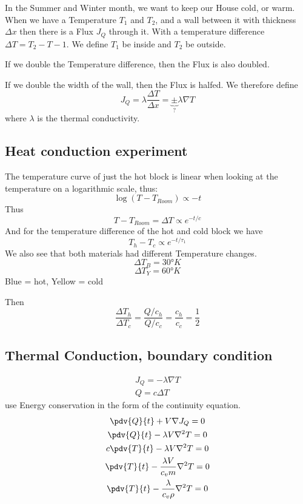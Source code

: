 \documentclass[]{scrartcl}
\begin{document}
In the Summer and Winter month, we want to keep our House cold, or warm. When we have a Temperature $T_1$ and $T_2$, and a wall between it with thickness $\Delta x$ then there is a Flux $J_Q$ through it. With a temperature difference $\Delta T = T_2 - T-1$. We define $T_1$ be inside and $T_2$ be outside.

If we double the Temperature difference, then the Flux is also doubled.

If we double the width of the wall, then the Flux is halfed. We therefore define
\begin{equation}
	J_Q = \lambda \frac{\Delta T}{\Delta x} = \underbrace{\pm}_{?}\lambda\nabla T
\end{equation}
where $\lambda$ is the thermal conductivity.

\subsection{Heat conduction experiment}

The temperature curve of just the hot block is linear when looking at the temperature on a logarithmic scale, thus:
\begin{equation}
	\log{(T-T_{Room})} \propto -t
\end{equation}
Thus
\begin{equation}
	T - T_{Room} = \Delta T\propto e^{-t/c}
\end{equation}
And for the temperature difference of the hot and cold block we have
\begin{equation}
	T_h - T_c \propto e^{-t/\tau_1}
\end{equation}
We also see that both materials had different Temperature changes.
\begin{equation}
	\Delta T_B = 30°K
\end{equation}
\begin{equation}
	\Delta T_Y = 60°K
\end{equation}
Blue = hot, Yellow = cold

Then
\begin{equation}
	\frac{\Delta T_h}{\Delta T_c} = \frac{Q/c_h}{Q/c_c} = \frac{c_h}{c_c} = \frac{1}{2}
\end{equation}

\subsection{Thermal Conduction, boundary condition}

\begin{gather}
	J_Q = -\lambda \nabla T\\
	Q = c\Delta T
\end{gather}
use Energy conservation in the form of the continuity equation.
\begin{gather}
	\pdv{Q}{t} + V\nabla J_Q = 0\\
	\pdv{Q}{t} - \lambda V \nabla^2 T = 0\\
	c\pdv{T}{t} - \lambda V\nabla^2 T = 0\\
	\pdv{T}{t} - \frac{\lambda V}{c_v m} \nabla^2 T = 0\\
	\pdv{T}{t} - \frac{\lambda}{c_v \rho}\nabla^2 T = 0
\end{gather}
\end{document}
